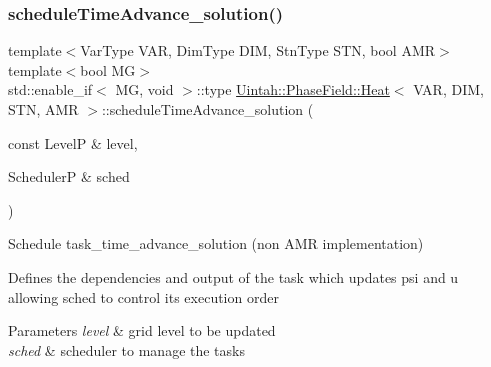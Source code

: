 \subsubsection{\texorpdfstring{schedule\+Time\+Advance\+\_\+solution()}{scheduleTimeAdvance\_solution()}\hspace{0.1cm}{\footnotesize\ttfamily [1/2]}}
{\footnotesize\ttfamily template$<$Var\+Type V\+AR, Dim\+Type D\+IM, Stn\+Type S\+TN, bool A\+MR$>$ \\
template$<$bool MG$>$ \\
std\+::enable\+\_\+if$<$ MG, void $>$\+::type \hyperlink{classUintah_1_1PhaseField_1_1Heat}{Uintah\+::\+Phase\+Field\+::\+Heat}$<$ V\+AR, D\+IM, S\+TN, A\+MR $>$\+::schedule\+Time\+Advance\+\_\+solution (\begin{DoxyParamCaption}\item[{const LevelP \&}]{level,  }\item[{SchedulerP \&}]{sched }\end{DoxyParamCaption})\hspace{0.3cm}{\ttfamily [protected]}}



Schedule task\+\_\+time\+\_\+advance\+\_\+solution (non A\+MR implementation) 

Defines the dependencies and output of the task which updates psi and u allowing sched to control its execution order


\begin{DoxyParams}{Parameters}
{\em level} & grid level to be updated \\
\hline
{\em sched} & scheduler to manage the tasks \\
\hline
\end{DoxyParams}
\mbox{\label{classUintah_1_1PhaseField_1_1Heat_a241faeed94f8958987941d69e1ed2d54}} 
